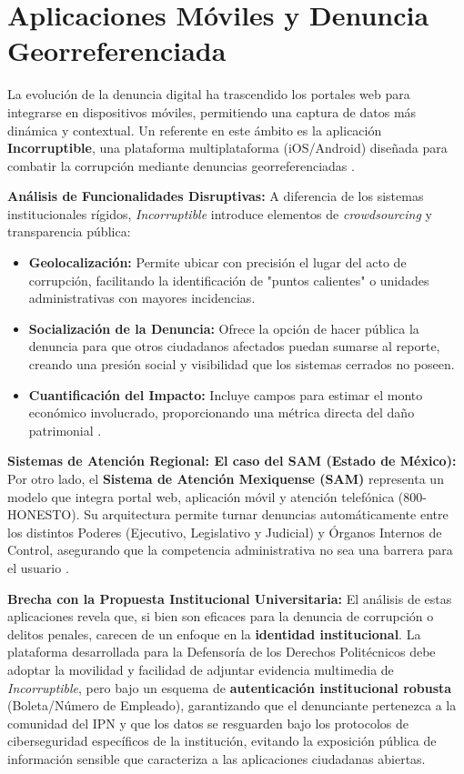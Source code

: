 \section{Aplicaciones Móviles y Denuncia Georreferenciada}

\begin{flushleft}
\justifying
La evolución de la denuncia digital ha trascendido los portales web para integrarse en dispositivos móviles, permitiendo una captura de datos más dinámica y contextual. Un referente en este ámbito es la aplicación \textbf{Incorruptible}, una plataforma multiplataforma (iOS/Android) diseñada para combatir la corrupción mediante denuncias georreferenciadas \cite{13}.

\textbf{Análisis de Funcionalidades Disruptivas:}
A diferencia de los sistemas institucionales rígidos, \textit{Incorruptible} introduce elementos de \textit{crowdsourcing} y transparencia pública:
\begin{itemize}
    \item \textbf{Geolocalización:} Permite ubicar con precisión el lugar del acto de corrupción, facilitando la identificación de "puntos calientes" o unidades administrativas con mayores incidencias.
    \item \textbf{Socialización de la Denuncia:} Ofrece la opción de hacer pública la denuncia para que otros ciudadanos afectados puedan sumarse al reporte, creando una presión social y visibilidad que los sistemas cerrados no poseen.
    \item \textbf{Cuantificación del Impacto:} Incluye campos para estimar el monto económico involucrado, proporcionando una métrica directa del daño patrimonial \cite{13}.
\end{itemize}

\textbf{Sistemas de Atención Regional: El caso del SAM (Estado de México):}
Por otro lado, el \textbf{Sistema de Atención Mexiquense (SAM)} representa un modelo que integra portal web, aplicación móvil y atención telefónica (800-HONESTO). Su arquitectura permite turnar denuncias automáticamente entre los distintos Poderes (Ejecutivo, Legislativo y Judicial) y Órganos Internos de Control, asegurando que la competencia administrativa no sea una barrera para el usuario \cite{14}.

\textbf{Brecha con la Propuesta Institucional Universitaria:}
El análisis de estas aplicaciones revela que, si bien son eficaces para la denuncia de corrupción o delitos penales, carecen de un enfoque en la \textbf{identidad institucional}. La plataforma desarrollada para la Defensoría de los Derechos Politécnicos debe adoptar la movilidad y facilidad de adjuntar evidencia multimedia de \textit{Incorruptible}, pero bajo un esquema de \textbf{autenticación institucional robusta} (Boleta/Número de Empleado), garantizando que el denunciante pertenezca a la comunidad del IPN y que los datos se resguarden bajo los protocolos de ciberseguridad específicos de la institución, evitando la exposición pública de información sensible que caracteriza a las aplicaciones ciudadanas abiertas.
\end{flushleft}


